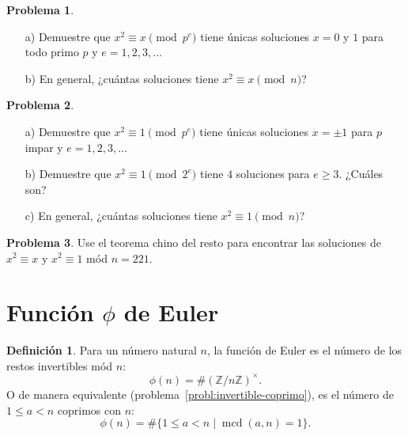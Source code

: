 \documentclass{article}
\newcommand{\ZZ}{\mathbb{Z}}
\DeclareMathOperator{\mcd}{mcd}
\theoremstyle{definition}
\newtheorem{problema}{Problema}[section]
\newtheorem*{definicion}{Definición}
\begin{document}
\begin{problema}
  ~

  \begin{enumerate}
  \item[a)] Demuestre que $x^2 \equiv x \pmod{p^e}$ tiene únicas soluciones
    $x = 0$ y $1$ para todo primo $p$ y $e = 1,2,3,\ldots$

  \item[b)] En general, ¿cuántas soluciones tiene $x^2 \equiv x \pmod{n}$?
  \end{enumerate}
\end{problema}

\begin{problema}
  ~

  \begin{enumerate}
  \item[a)] Demuestre que $x^2 \equiv 1 \pmod{p^e}$ tiene únicas soluciones
    $x = \pm 1$ para $p$ impar y $e = 1,2,3,\ldots$

  \item[b)] Demuestre que $x^2 \equiv 1 \pmod{2^e}$ tiene $4$ soluciones para
    $e \ge 3$. ¿Cuáles son?

  \item[c)] En general, ¿cuántas soluciones tiene $x^2 \equiv 1 \pmod{n}$?
  \end{enumerate}
\end{problema}

\begin{problema}
  Use el teorema chino del resto para encontrar las soluciones de
  $x^2 \equiv x$ y $x^2 \equiv 1$ mód $n = 221$.
\end{problema}


\section{Función $\phi$ de Euler}

\begin{definicion}
  Para un número natural $n$, la función de Euler es el número de los restos
  invertibles mód $n$:
  $$\phi (n) = \# (\ZZ/n\ZZ)^\times.$$
  O de manera equivalente (problema~\ref{probl:invertible-coprimo}),
  es el número de $1 \le a < n$ coprimos con $n$:
  $$\phi (n) = \# \{ 1 \le a < n \mid \mcd (a,n) = 1 \}.$$
\end{definicion}
\end{document}
